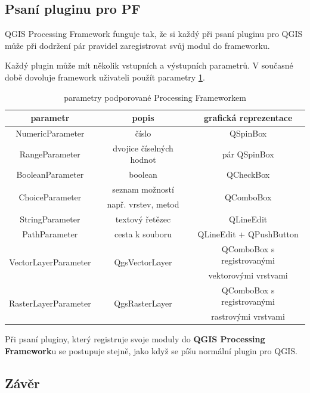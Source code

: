 \subsection{Psaní pluginu pro PF}

QGIS Processing Framework funguje tak, že si každý při psaní pluginu pro QGIS může při dodržení pár pravidel zaregistrovat svůj modul do frameworku. 

Každý plugin může mít několik vstupních a výstupních parametrů. V současné době dovoluje framework uživateli použít parametry \ref{tab:pf_parametry}.

\begin{table}[h]	
	\centering
	\begin{tabular}{|c|c|c|}
		\hline
		\textbf{parametr} & \textbf{popis} & \textbf{grafická reprezentace}\\
		\hline
		\hline
		NumericParameter & číslo & QSpinBox\\
		\hline
		RangeParameter & dvojice číselných hodnot & pár QSpinBox\\	
		\hline
		BooleanParameter & boolean & QCheckBox\\		
		\hline
		\multirow{2}{*}{ChoiceParameter} & seznam možností & \multirow{2}{*}{QComboBox}\\
		& např. vrstev, metod & \\
		\hline
		StringParameter & textový řetězec & QLineEdit \\
		\hline
		PathParameter & cesta k souboru & QLineEdit + QPushButton \\
		\hline
		\multirow{2}{*}{VectorLayerParameter} & \multirow{2}{*}{QgsVectorLayer} & QComboBox s registrovanými \\
		& & vektorovými vrstvami\\
		\hline
		\multirow{2}{*}{RasterLayerParameter} & \multirow{2}{*}{QgsRasterLayer} & QComboBox s registrovanými \\
		& & rastrovými vrstvami\\		
		\hline	
	\end{tabular}
	\caption{parametry podporované Processing Frameworkem}
	\label{tab:pf_parametry}
\end{table}

Při psaní pluginy, který registruje svoje moduly do \textbf{QGIS Processing Framework}u se postupuje stejně, jako když se píšu normální plugin pro QGIS.


\subsection{Závěr}

